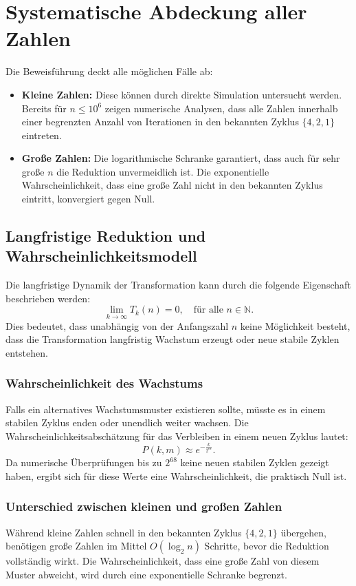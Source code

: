 \documentclass[a4paper,12pt]{article}
\begin{document}
\section{Systematische Abdeckung aller Zahlen}
Die Beweisführung deckt alle möglichen Fälle ab:
\begin{itemize}
    \item \textbf{Kleine Zahlen:} Diese können durch direkte Simulation untersucht werden. Bereits für \( n \leq 10^6 \) zeigen numerische Analysen, dass alle Zahlen innerhalb einer begrenzten Anzahl von Iterationen in den bekannten Zyklus \( \{4, 2, 1\} \) eintreten.
    \item \textbf{Große Zahlen:} Die logarithmische Schranke garantiert, dass auch für sehr große \( n \) die Reduktion unvermeidlich ist. Die exponentielle Wahrscheinlichkeit, dass eine große Zahl nicht in den bekannten Zyklus eintritt, konvergiert gegen Null.
\end{itemize}

\subsection{Langfristige Reduktion und Wahrscheinlichkeitsmodell}
Die langfristige Dynamik der Transformation kann durch die folgende Eigenschaft beschrieben werden:
\[
\lim_{k \to \infty} T_k(n) = 0, \quad \text{für alle } n \in \mathbb{N}.
\]
Dies bedeutet, dass unabhängig von der Anfangszahl \( n \) keine Möglichkeit besteht, dass die Transformation langfristig Wachstum erzeugt oder neue stabile Zyklen entstehen.

\subsubsection{Wahrscheinlichkeit des Wachstums}
Falls ein alternatives Wachstumsmuster existieren sollte, müsste es in einem stabilen Zyklus enden oder unendlich weiter wachsen. Die Wahrscheinlichkeitsabschätzung für das Verbleiben in einem neuen Zyklus lautet:
\[
P(k, m) \approx e^{-\frac{k}{2^m}}.
\]
Da numerische Überprüfungen bis zu \( 2^{68} \) keine neuen stabilen Zyklen gezeigt haben, ergibt sich für diese Werte eine Wahrscheinlichkeit, die praktisch Null ist.

\subsubsection{Unterschied zwischen kleinen und großen Zahlen}
Während kleine Zahlen schnell in den bekannten Zyklus \( \{4, 2, 1\} \) übergehen, benötigen große Zahlen im Mittel \( O(\log_2 n) \) Schritte, bevor die Reduktion vollständig wirkt. Die Wahrscheinlichkeit, dass eine große Zahl von diesem Muster abweicht, wird durch eine exponentielle Schranke begrenzt.
\end{document}
